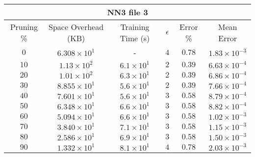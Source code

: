 \begin{adjustwidth}{0cm}{}
\begin{tabular}{cccccc}
\hline
\multicolumn{6}{c}{NN3 file 3} \\
\toprule
Pruning \% & Space Overhead (KB) & Training Time (s) & $\epsilon$ & Error \% & Mean Error\\
\midrule
$0$ & $6.308 \times 10^{1}$ & - & $4$ & $0.78$ & $1.83 \times 10^{-3}$\\
$10$ & $1.13 \times 10^2 $ & $6.1 \times 10^{1}$ & $2$ & $0.39$ & $6.63 \times 10^{-4}$\\
$20$ & $1.01 \times 10^2 $ & $6.3 \times 10^{1}$ & $2$ & $0.39$ & $6.86 \times 10^{-4}$\\
$30$ & $8.855 \times 10^{1}$ & $5.6 \times 10^{1}$ & $2$ & $0.39$ & $7.66 \times 10^{-4}$\\
$40$ & $7.601 \times 10^{1}$ & $5.6 \times 10^{1}$ & $3$ & $0.58$ & $8.79 \times 10^{-4}$\\
$50$ & $6.348 \times 10^{1}$ & $6.6 \times 10^{1}$ & $3$ & $0.58$ & $8.82 \times 10^{-4}$\\
$60$ & $5.094 \times 10^{1}$ & $6.6 \times 10^{1}$ & $3$ & $0.58$ & $1.02 \times 10^{-3}$\\
$70$ & $3.840 \times 10^{1}$ & $7.1 \times 10^{1}$ & $3$ & $0.58$ & $1.15 \times 10^{-3}$\\
$80$ & $2.586 \times 10^{1}$ & $6.9 \times 10^{1}$ & $3$ & $0.58$ & $1.50 \times 10^{-3}$\\
$90$ & $1.332 \times 10^{1}$ & $8.1 \times 10^{1}$ & $4$ & $0.78$ & $2.03 \times 10^{-3}$\\
\bottomrule
\end{tabular}
\end{adjustwidth}

\par\null\par
\par\null\par

